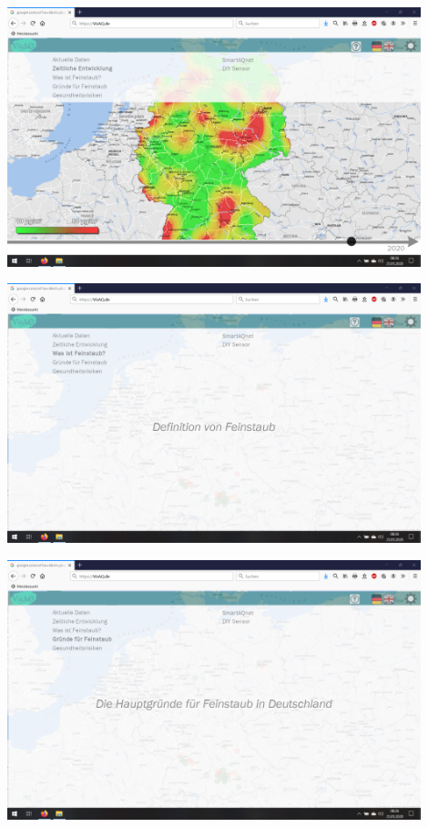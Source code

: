 \begin{center}
	\includegraphics[width=0.9\textwidth]{media/Zeitliche-Entwicklung} 
	
	\includegraphics[width=0.9\textwidth]{media/Definition-von-Feinstaub} 
	
	\includegraphics[width=0.9\textwidth]{media/Gruende-Feinstaub} 
	

\end{center}
